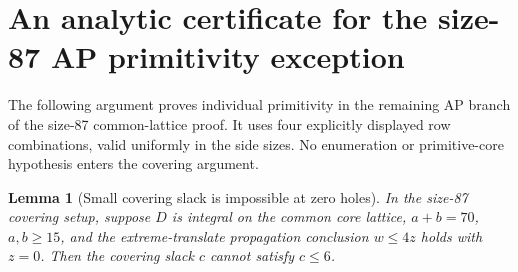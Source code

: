 \documentclass[11pt,a4paper]{article}
\newtheorem{lemma}[theorem]{Lemma}
\theoremstyle{remark}
\begin{document}
\clearpage

\section[Four analytic covering combinations at size 87]{An analytic certificate for the size-87 AP primitivity exception}
\label{u86ap:sec:certificate}

The following argument proves individual primitivity in the remaining
AP branch of the size-87 common-lattice proof. It uses four explicitly displayed row
combinations, valid uniformly in the side sizes. No enumeration or
primitive-core hypothesis enters the covering argument.

\begin{lemma}[Small covering slack is impossible at zero holes]
\label{u86ap:lem:small-slack}
In the size-87 covering setup, suppose $D$ is integral on the common
core lattice, $a+b=70$, $a,b\ge15$, and the extreme-translate propagation
conclusion $w\le4z$ holds with $z=0$. Then the covering slack $c$ cannot satisfy
$c\le6$.
\end{lemma}
\end{document}

